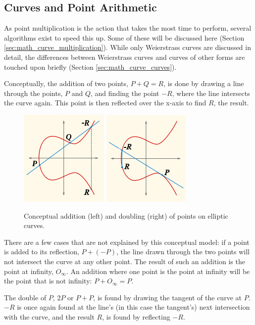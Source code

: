 \subsection{Curves and Point Arithmetic}
\label{sec:math_curve}

As point multiplication is the action that takes the most time to perform,\cite{safecurves} several algorithms exist to
speed this up. Some of these will be discussed here (Section \ref{sec:math_curve_multiplication}). While only Weierstrass
curves are discussed in detail, the differences between Weierstrass curves and curves of other forms are touched upon briefly
(Section \ref{sec:math_curve_curves}).

Conceptually, the addition of two points, \(P + Q = R\), is done by drawing a line through the points, \(P\) and \(Q\),
and finding the point \(-R\), where the line intersects the curve again. This point is
then reflected over the x-axis to find \(R\), the result.

\begin{figure}[htb]
	\centering
	\includegraphics{maths/addition}
	\includegraphics{maths/doubling}
	\caption{Conceptual addition (left) and doubling (right) of points on elliptic curves.}
\end{figure}

There are a few cases that are not explained by this conceptual model: if a point is added to its reflection, \(P + (-P)\),
the line drawn through the two points will not intersect the curve at any other point. The result of such an addition is
the point at infinity, \(O_\infty\). An addition where one point is the point at infinity will be the point that is not
infinity: \(P + O_\infty = P\).

The double of \(P\), \(2P\) or \(P+P\), is found by drawing the tangent of the curve at \(P\).
\(-R\) is once again found at the line's (in this case the tangent's) next intersection
with the curve, and the result \(R\), is found by reflecting \(-R\).\cite{hankerson2010}


